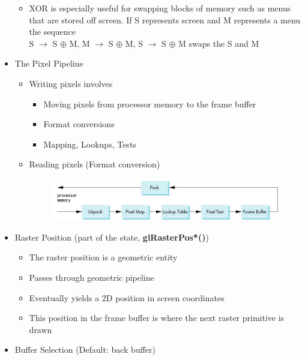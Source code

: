 \documentclass[11pt,a4paper]{article}
\begin{document}
\begin{itemize}
\begin{itemize}
\begin{figure}[h]
					\end{figure}
					\item XOR is especially useful for swapping blocks of memory such as menus that are stored off screen. If S represents screen and M represents a menu the sequence\\
					S $\rightarrow$ S $\oplus$ M, 
					M $\rightarrow$ S $\oplus$ M, 
					S $\rightarrow$ S $\oplus$ M swaps the S and M
				\end{itemize}
			\item The Pixel Pipeline
				\begin{itemize}
					\item Writing pixels involves
						\begin{itemize}
							\item Moving pixels from processor memory to the frame buffer
							\item Format conversions
							\item Mapping, Lookups, Tests
						\end{itemize}
					\item Reading pixels (Format conversion)
					\begin{figure}[h]
						\hspace{2.0cm}
						\vspace{-0.6cm}
						\includegraphics[scale=0.4]{pictures/PixelPipeline.jpg}
					\end{figure}
				\end{itemize}
			\item Raster Position (part of the state, \textbf{glRasterPos*()})
				\begin{itemize}
					\item The raster position is a geometric entity
					\item Passes through geometric pipeline
					\item Eventually yields a 2D position in screen coordinates
					\item This position in the frame buffer is where the next raster primitive is drawn
				\end{itemize}			
			\item Buffer Selection (Default: back buffer)
				\begin{itemize}

\end{itemize}
\end{itemize}
\end{document}
